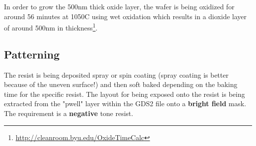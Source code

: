 In order to grow the 500nm thick oxide layer, the wafer is being oxidized for around 56 minutes at 1050\degree C using wet oxidation which results in a dioxide layer of around 500nm in thickness\footnote{\url{http://cleanroom.byu.edu/OxideTimeCalc}}.

\subsection{Patterning}
The resist is being deposited spray or spin coating (spray coating is better because of the uneven surface!) and then soft baked depending on the baking time for the specific resist.
The layout for being exposed onto the resist is being extracted from the "pwell" layer within the GDS2 file onto a \textbf{bright field} mask.
The requirement is a \textbf{negative} tone resist.

